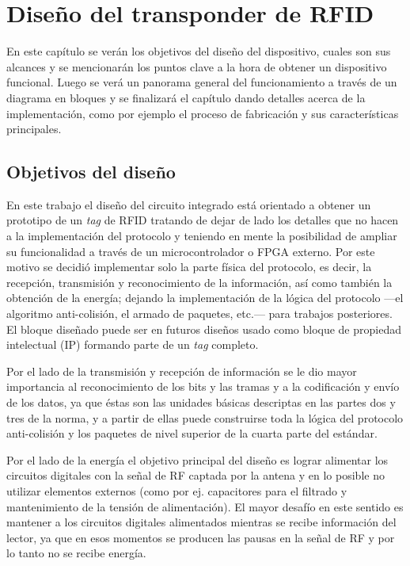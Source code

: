 \chapter{Diseño del transponder de RFID}

En este capítulo se verán los objetivos del diseño del dispositivo, 
cuales son sus alcances y se mencionarán los puntos clave a la hora de 
obtener un dispositivo funcional. Luego se verá un panorama general 
del funcionamiento a través de un diagrama en bloques y se finalizará 
el capítulo dando detalles acerca de la implementación, como por 
ejemplo el proceso de fabricación y sus características principales.


\section{Objetivos del diseño}

En este trabajo el diseño del circuito integrado está orientado a obtener un 
prototipo de un \emph{tag} de RFID tratando de dejar de lado los detalles 
que no hacen a la implementación del protocolo y teniendo en mente la 
posibilidad de ampliar su funcionalidad a través de un microcontrolador o 
FPGA externo. Por este motivo se decidió implementar solo la parte física 
del protocolo, es decir, la recepción, transmisión y reconocimiento de la 
información, así como también la obtención de la energía; dejando la 
implementación de la lógica del protocolo ---el algoritmo anti-colisión, el 
armado de paquetes, etc.--- para trabajos posteriores. El bloque diseñado
puede ser en futuros diseños usado como bloque de propiedad intelectual (IP)
formando parte de un \emph{tag} completo.

Por el lado de la transmisión y recepción de información se le dio mayor 
importancia al reconocimiento de los bits y las tramas y a la codificación y 
envío de los datos, ya que éstas son las unidades básicas descriptas en las 
partes dos y tres de la norma, y a partir de ellas puede construirse toda la 
lógica del protocolo anti-colisión y los paquetes de nivel superior de la 
cuarta parte del estándar.

Por el lado de la energía el objetivo principal del diseño es lograr 
alimentar los circuitos digitales con la señal de RF captada por la antena y 
en lo posible no utilizar elementos externos (como por ej. capacitores para 
el filtrado y mantenimiento de la tensión de alimentación). El mayor desafío 
en este sentido es mantener a los circuitos digitales alimentados mientras 
se recibe información del lector, ya que en esos momentos se producen las 
pausas en la señal de RF y por lo tanto no se recibe energía.


